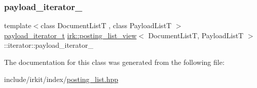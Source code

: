 \mbox{\label{classirk_1_1posting__list__view_1_1iterator_a40e39b6fdfe8815f50f6030194b1f422}} 
\subsubsection{\texorpdfstring{payload\+\_\+iterator\+\_\+}{payload\_iterator\_}}
{\footnotesize\ttfamily template$<$class Document\+ListT , class Payload\+ListT $>$ \\
\mbox{\hyperlink{classirk_1_1posting__list__view_a5a153169348a164ea2cb1a18dc76e279}{payload\+\_\+iterator\+\_\+t}} \mbox{\hyperlink{classirk_1_1posting__list__view}{irk\+::posting\+\_\+list\+\_\+view}}$<$ Document\+ListT, Payload\+ListT $>$\+::iterator\+::payload\+\_\+iterator\+\_\+}



The documentation for this class was generated from the following file\+:\begin{DoxyCompactItemize}
\item 
include/irkit/index/\mbox{\hyperlink{posting__list_8hpp}{posting\+\_\+list.\+hpp}}\end{DoxyCompactItemize}

